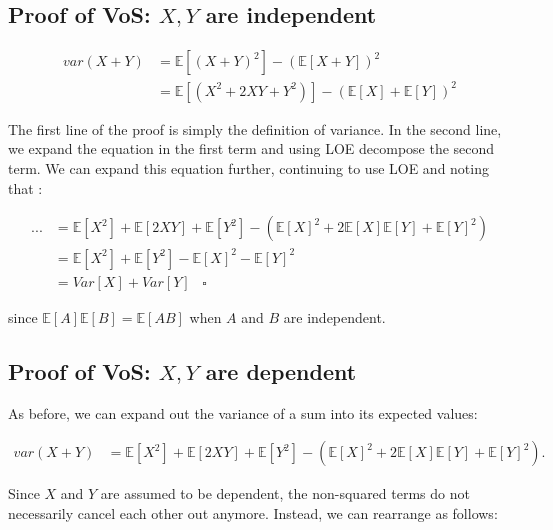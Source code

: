 \documentclass[
]{book}
\begin{document}
\hypertarget{proof-of-vos-x-y-are-independent}{%
\subsection{\texorpdfstring{Proof of VoS: \(X, Y\) are independent}{Proof of VoS: X, Y are independent}}\label{proof-of-vos-x-y-are-independent}}

\begin{align}
    var(X + Y) &= \mathbb{E}[(X+Y)^2] - (\mathbb{E}[X+Y])^2 \\
    &= \mathbb{E}[(X^2 + 2XY + Y^2)] - (\mathbb{E}[X] + \mathbb{E}[Y])^2
\end{align}

The first line of the proof is simply the definition of variance. In the second line, we expand the equation in the first term and using LOE decompose the second term. We can expand this equation further, continuing to use LOE and noting that :

\begin{align}
    ... &= \mathbb{E}[X^2] + \mathbb{E}[2XY] + \mathbb{E}[Y^2] - (\mathbb{E}[X]^2 + 2\mathbb{E}[X]\mathbb{E}[Y] + \mathbb{E}[Y]^2)\\
     &= \mathbb{E}[X^2] + \mathbb{E}[Y^2] - \mathbb{E}[X]^2 - \mathbb{E}[Y]^2 \\
     &= Var[X] + Var[Y] \; \; \; \square
\end{align}

since \(\mathbb{E}[A]\mathbb{E}[B] = \mathbb{E}[AB]\) when \(A\) and \(B\) are independent.

\hypertarget{proof-of-vos-x-y-are-dependent}{%
\subsection{\texorpdfstring{Proof of VoS: \(X, Y\) are dependent}{Proof of VoS: X, Y are dependent}}\label{proof-of-vos-x-y-are-dependent}}

As before, we can expand out the variance of a sum into its expected values:

\begin{align}
    var(X + Y) &= \mathbb{E}[X^2] + \mathbb{E}[2XY] + \mathbb{E}[Y^2] - (\mathbb{E}[X]^2 + 2\mathbb{E}[X]\mathbb{E}[Y] + \mathbb{E}[Y]^2).
\end{align}

Since \(X\) and \(Y\) are assumed to be dependent, the non-squared terms do not necessarily cancel each other out anymore. Instead, we can rearrange as follows:
\end{document}
